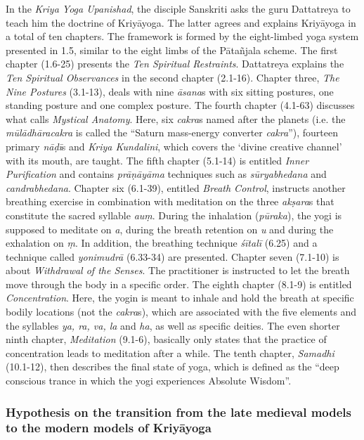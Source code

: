 In the \textit{Kriya Yoga Upanishad}, the disciple Sanskriti asks the guru Dattatreya to teach him the doctrine of Kriyāyoga. The latter agrees and explains Kriyāyoga in a total of ten chapters. The framework is formed by the eight-limbed yoga system presented in 1.5, similar to the eight limbs of the Pātañjala scheme. The first chapter (1.6-25) presents the \textit{Ten Spiritual Restraints}. Dattatreya explains the \textit{Ten Spiritual Observances} in the second chapter (2.1-16). Chapter three, \textit{The Nine Postures} (3.1-13), deals with nine \textit{āsana}s with six sitting postures, one standing posture and one complex posture. The fourth chapter (4.1-63) discusses what \citeauthor{kriyayogaupanishad1993} calls \textit{Mystical Anatomy}. Here, six \textit{cakra}s named after the planets (i.e. the \textit{mūlādhāracakra} is called the ``Saturn mass-energy converter \textit{cakra}''), fourteen primary \textit{nāḍī}s and \textit{Kriya Kundalini}, which covers the `divine creative channel' with its mouth, are taught. The fifth chapter (5.1-14) is entitled \textit{Inner Purification} and contains \textit{prāṇāyāma} techniques such as \textit{sūryabhedana} and \textit{candrabhedana}. Chapter six (6.1-39), entitled \textit{Breath Control}, instructs another breathing exercise in combination with meditation on the three \textit{akṣara}s that constitute the sacred syllable \textit{auṃ}. During the inhalation (\textit{pūraka}), the yogi is supposed to meditate on \textit{a}, during the breath retention on \textit{u} and during the exhalation on \textit{ṃ}. In addition, the breathing technique \textit{śītalī} (6.25) and a technique called \textit{yonimudrā} (6.33-34) are presented. Chapter seven (7.1-10) is about \textit{Withdrawal of the Senses}. The practitioner is instructed to let the breath move through the body in a specific order. The eighth chapter (8.1-9) is entitled \textit{Concentration}. Here, the yogin is meant to inhale and hold the breath at specific bodily locations (not the \textit{cakra}s), which are associated with the five elements and the syllables \textit{ya, ra, va, la} and \textit {ha}, as well as specific deities. The even shorter ninth chapter, \textit{Meditation} (9.1-6), basically only states that the practice of concentration leads to meditation after a while. The tenth chapter, \textit{Samadhi} (10.1-12), then describes the final state of yoga, which is defined as the ``deep conscious trance in which the yogi experiences Absolute Wisdom''.

\subsubsection{Hypothesis on the transition from the late medieval models to the modern models of Kriyāyoga}

